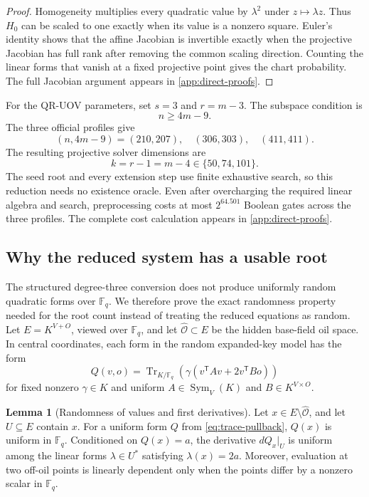\documentclass[11pt,a4paper]{article}
\theoremstyle{definition}
\newtheorem{lemma}[theorem]{Lemma}
\theoremstyle{remark}
\newcommand{\F}{\mathbb F}
\newcommand{\cO}{\mathcal O}
\newcommand{\Sym}{\operatorname{Sym}}
\newcommand{\Tr}{\operatorname{Tr}}
\begin{document}
\begin{proof}
Homogeneity multiplies every quadratic value by $\lambda^2$ under
$z\mapsto\lambda z$.  Thus $H_0$ can be scaled to one exactly when its value
is a nonzero square.  Euler's identity shows that the affine Jacobian is
invertible exactly when the projective Jacobian has full rank after removing
the common scaling direction.  Counting the
linear forms that vanish at a fixed projective point gives the chart
probability.  The full Jacobian argument appears in
\cref{app:direct-proofs}.
\end{proof}

For the QR-UOV parameters, set $s=3$ and $r=m-3$.  The subspace condition is
\begin{equation}\label{eq:official-cw-condition}
 n\ge4m-9.
\end{equation}
The three official profiles give
\[
 (n,4m-9)=(210,207),\quad(306,303),\quad(411,411).
\]
The resulting projective solver dimensions are
\begin{equation}\label{eq:official-projective-cores}
 k=r-1=m-4\in\{50,74,101\}.
\end{equation}
The seed root and every extension step use finite exhaustive search, so this
reduction needs no existence oracle.  Even after overcharging the required
linear algebra and search, preprocessing costs at most $2^{64.501}$ Boolean
gates across the three profiles.  The complete cost calculation appears in
\cref{app:direct-proofs}.

\subsection{Why the reduced system has a usable root}

The structured degree-three conversion does not produce uniformly random
quadratic forms over $\F_q$.  We therefore prove the exact randomness property
needed for the root count instead of treating the reduced equations as random.
Let $E=K^{V+O}$, viewed over $\F_q$, and let
$\widehat{\cO}\subset E$ be the hidden base-field oil space.  In central
coordinates, each form in the random expanded-key model has the form
\begin{equation}\label{eq:trace-pullback}
 Q(v,o)=\Tr_{K/\F_q}\!\left(\gamma
 (v^{\mathsf T}Av+2v^{\mathsf T}Bo)\right)
\end{equation}
for fixed nonzero $\gamma\in K$ and uniform
$A\in\Sym_V(K)$ and $B\in K^{V\times O}$.

\begin{lemma}[Randomness of values and first derivatives]\label{lem:pullback-one-jet}
Let $x\in E\setminus\widehat{\cO}$, and let $U\subseteq E$ contain $x$.  For a
uniform form $Q$ from \eqref{eq:trace-pullback}, $Q(x)$ is uniform in $\F_q$.
Conditioned on $Q(x)=a$, the derivative $dQ_x|_U$ is uniform among the linear
forms $\lambda\in U^*$ satisfying $\lambda(x)=2a$.  Moreover, evaluation at
two off-oil points is linearly dependent only when the points differ by a
nonzero scalar in $\F_q$.
\end{lemma}
\end{document}

